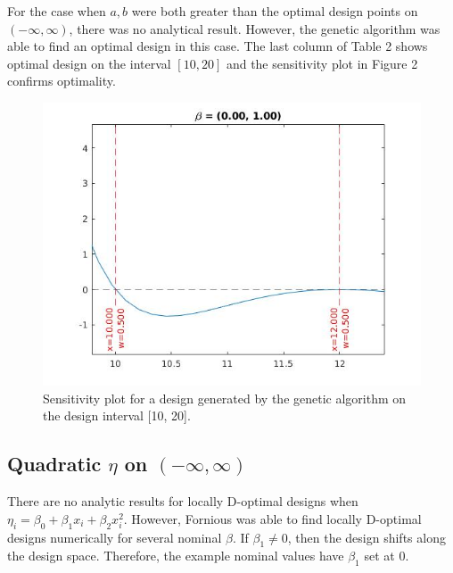 \documentclass[11pt,a4paper]{article}
\begin{document}
For the case when $a,b$ were both greater than the optimal design points on $(-\infty, \infty)$, there was no analytical result. However, the genetic algorithm was able to find an optimal design in this case. The last column of Table 2 shows optimal design on the interval $[10,20]$ and the sensitivity plot in Figure 2 confirms optimality.

\begin{figure}
\centering
\includegraphics[scale=0.5]{figures/fig2.jpg}
\caption{Sensitivity plot for a design generated by the genetic algorithm on the design interval [10, 20].}
\end{figure}

\subsection{Quadratic $\eta$ on $(-\infty, \infty)$}
There are no analytic results for locally D-optimal designs when $\eta_i = \beta_0 + \beta_1 x_i + \beta_2 x_i^2$. However, Fornious was able to find locally D-optimal designs numerically for several nominal $\beta$. If $\beta_1 \neq 0$, then the design shifts along the design space. Therefore, the example nominal values have $\beta_1$ set at 0.
\end{document}
